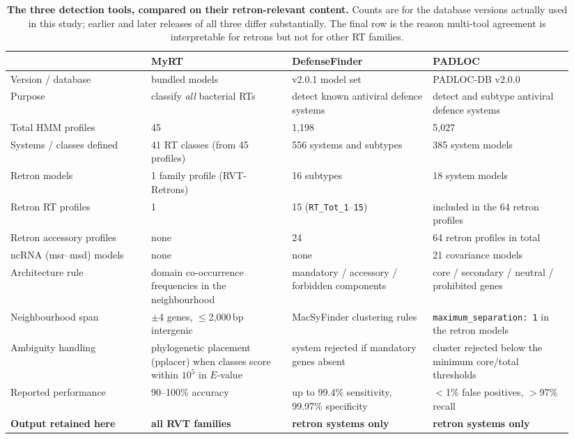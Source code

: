 \begin{table}[H]
\centering
\footnotesize
\setlength{\tabcolsep}{4pt}
\caption[Comparison of the three detection tools]{%
\textbf{The three detection tools, compared on their retron-relevant content.}
Counts are for the database versions actually used in this study; earlier and later
releases of all three differ substantially. The final row is the reason multi-tool
agreement is interpretable for retrons but not for other RT families.}
\label{tab:tool_comparison}
\begin{tabular}{@{}p{0.235\linewidth}p{0.235\linewidth}p{0.235\linewidth}p{0.235\linewidth}@{}}
\toprule
 & \textbf{MyRT} & \textbf{DefenseFinder} & \textbf{PADLOC} \\
\midrule
Version / database
 & bundled models
 & v2.0.1 model set
 & PADLOC-DB v2.0.0 \\
\addlinespace
Purpose
 & classify \emph{all} bacterial RTs
 & detect known antiviral defence systems
 & detect and subtype antiviral defence systems \\
\addlinespace
Total HMM profiles
 & 45
 & 1{,}198
 & 5{,}027 \\
\addlinespace
Systems / classes defined
 & 41 RT classes (from 45 profiles)
 & 556 systems and subtypes
 & 385 system models \\
\addlinespace
Retron models
 & 1 family profile (RVT-Retrons)
 & 16 subtypes
 & 18 system models \\
\addlinespace
Retron RT profiles
 & 1
 & 15 (\texttt{RT\_Tot\_1}--\texttt{15})
 & included in the 64 retron profiles \\
\addlinespace
Retron accessory profiles
 & none
 & 24
 & 64 retron profiles in total \\
\addlinespace
ncRNA (msr--msd) models
 & none
 & none
 & 21 covariance models \\
\addlinespace
Architecture rule
 & domain co-occurrence frequencies in the neighbourhood
 & mandatory / accessory / forbidden components
 & core / secondary / neutral / prohibited genes \\
\addlinespace
Neighbourhood span
 & $\pm$4 genes, $\le$2{,}000\,bp intergenic
 & MacSyFinder clustering rules
 & \texttt{maximum\_separation:\ 1} in the retron models \\
\addlinespace
Ambiguity handling
 & phylogenetic placement (pplacer) when classes score within $10^{5}$ in $E$-value
 & system rejected if mandatory genes absent
 & cluster rejected below the minimum core/total thresholds \\
\addlinespace
Reported performance
 & 90--100\% accuracy
 & up to 99.4\% sensitivity, 99.97\% specificity
 & $<$1\% false positives, $>$97\% recall \\
\midrule
\textbf{Output retained here}
 & \textbf{all RVT families}
 & \textbf{retron systems only}
 & \textbf{retron systems only} \\
\bottomrule
\end{tabular}
\end{table}


